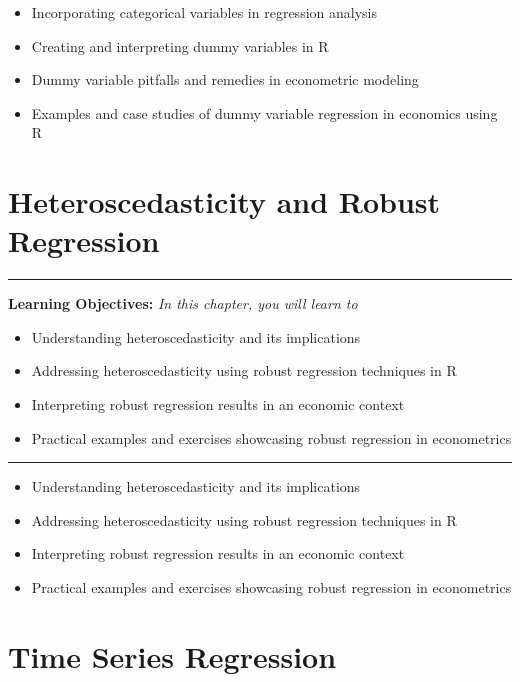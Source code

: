 \documentclass[
  letterpaper,
  twoside,
  openany]{scrbook}
\providecommand{\abstractname}{Learning Objectives} %
\newenvironment{objectives}[1]{%
	\hrule
	\vspace{5pt}
	\small\textbf{\abstractname: } 
	\newline
	\vspace{0.1cm}
	\small\emph{#1} %
	\itshape %
}{%
	\vspace{5pt}
	\hrule
	\vspace{0.6cm}
}
\begin{document}
\begin{itemize}
\item
  Incorporating categorical variables in regression analysis
\item
  Creating and interpreting dummy variables in R
\item
  Dummy variable pitfalls and remedies in econometric modeling
\item
  Examples and case studies of dummy variable regression in economics
  using R
\end{itemize}

\hypertarget{heteroscedasticity-and-robust-regression}{%
\chapter{Heteroscedasticity and Robust
Regression}\label{heteroscedasticity-and-robust-regression}}

\begin{objectives}{In this chapter, you will learn to}
\begin{itemize}

\item{Understanding heteroscedasticity and its implications}

\item{Addressing heteroscedasticity using robust regression techniques in R}

\item{Interpreting robust regression results in an economic context}

\item{Practical examples and exercises showcasing robust regression in econometrics}

\end{itemize}

\end{objectives}

\begin{itemize}
\item
  Understanding heteroscedasticity and its implications
\item
  Addressing heteroscedasticity using robust regression techniques in R
\item
  Interpreting robust regression results in an economic context
\item
  Practical examples and exercises showcasing robust regression in
  econometrics
\end{itemize}

\hypertarget{time-series-regression}{%
\chapter{Time Series Regression}\label{time-series-regression}}
\end{document}
